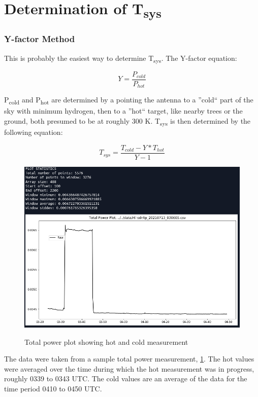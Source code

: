 \documentclass[letterpaper, 12pt]{article}
\begin{document}
\section{Determination of T\textsubscript{sys}}

\subsubsection{Y-factor Method}
This is probably the easiest way to determine T\textsubscript{sys}. The Y-factor equation:

\begin{equation}
Y = \frac{P_{cold}}{P_{hot}}
\end{equation}

P\textsubscript{cold} and P\textsubscript{hot} are determined by a pointing the antenna to a ''cold`` part of the sky with minimum hydrogen, then to a ''hot`` target, like nearby trees or the ground, both presumed to be at roughly 300 K. 
T\textsubscript{sys} is then determined by the following equation:

\begin{equation}
T_{sys} = \frac{T_{cold} - Y *T_{hot}}{Y - 1}
\end{equation}

\begin{figure}[h!]
	\centering
	\includegraphics[scale = 0.5]{tp_20210713_030605.png}
	\label{tplot}
	\caption{Total power plot showing hot and cold measurement}
\end{figure}

The data were taken from a sample total power measurement, \ref{tplot}. The hot values were averaged over the time during which the hot measurement was in progress, roughly 0339 to 0343 UTC. The cold values are an average of the data for the time period 0410 to 0450 UTC.  
\end{document}
